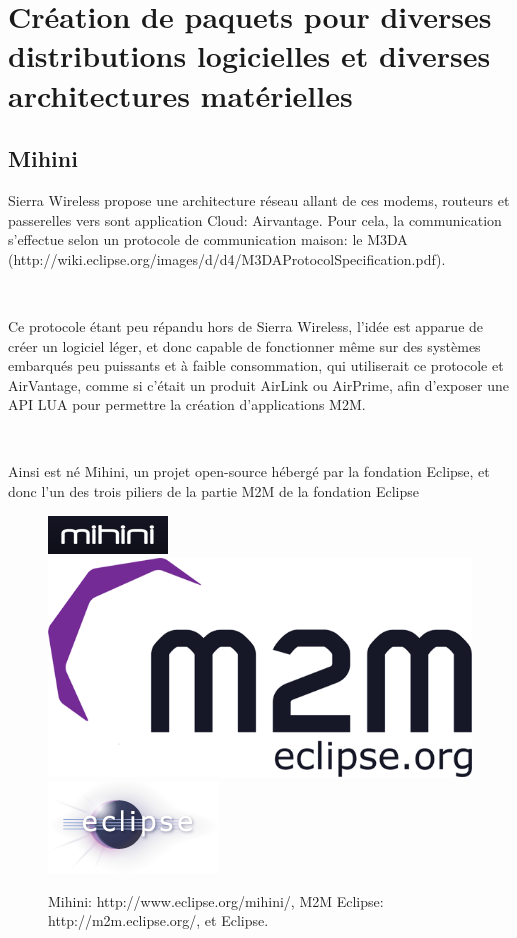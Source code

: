 \documentclass{article}
\begin{document}
\clearpage

\section{Création de paquets pour diverses distributions logicielles et diverses architectures matérielles}
\subsection{Mihini}

Sierra Wireless propose une architecture réseau allant de ces modems, routeurs et passerelles vers sont application Cloud: Airvantage.
Pour cela, la communication s’effectue selon un protocole de communication maison: le M3DA (http://wiki.eclipse.org/images/d/d4/M3DAProtocolSpecification.pdf).

~

Ce protocole étant peu répandu hors de Sierra Wireless, l’idée est apparue de créer un logiciel léger, et donc capable de fonctionner même sur des systèmes embarqués peu puissants et à faible consommation, qui utiliserait ce protocole et AirVantage, comme si c’était un produit AirLink ou AirPrime, afin d’exposer une API LUA pour permettre la création d’applications M2M.

~

Ainsi est né Mihini, un projet open-source hébergé par la fondation Eclipse, et donc l’un des trois piliers de la partie M2M de la fondation Eclipse

\begin{figure}[h!]
    \centering
    \includegraphics{img/mihini_logo.png}
    \includegraphics[width=\linewidth/3]{img/M2M.png}
    \includegraphics{img/eclipse.png}
    \caption{Mihini: http://www.eclipse.org/mihini/, M2M Eclipse: http://m2m.eclipse.org/, et Eclipse.}
\end{figure}
\end{document}
